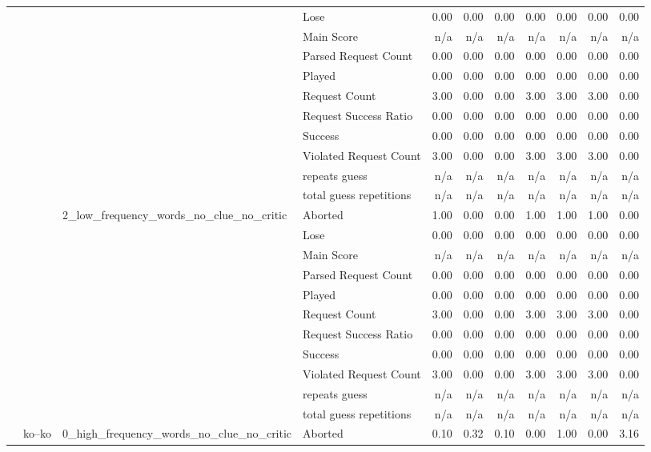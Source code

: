 \begin{tabular}{llllrrrrrrr}
 &  &  & Lose & 0.00 & 0.00 & 0.00 & 0.00 & 0.00 & 0.00 & 0.00 \\
 &  &  & Main Score & n/a & n/a & n/a & n/a & n/a & n/a & n/a \\
 &  &  & Parsed Request Count & 0.00 & 0.00 & 0.00 & 0.00 & 0.00 & 0.00 & 0.00 \\
 &  &  & Played & 0.00 & 0.00 & 0.00 & 0.00 & 0.00 & 0.00 & 0.00 \\
 &  &  & Request Count & 3.00 & 0.00 & 0.00 & 3.00 & 3.00 & 3.00 & 0.00 \\
 &  &  & Request Success Ratio & 0.00 & 0.00 & 0.00 & 0.00 & 0.00 & 0.00 & 0.00 \\
 &  &  & Success & 0.00 & 0.00 & 0.00 & 0.00 & 0.00 & 0.00 & 0.00 \\
 &  &  & Violated Request Count & 3.00 & 0.00 & 0.00 & 3.00 & 3.00 & 3.00 & 0.00 \\
 &  &  & repeats guess & n/a & n/a & n/a & n/a & n/a & n/a & n/a \\
 &  &  & total guess repetitions & n/a & n/a & n/a & n/a & n/a & n/a & n/a \\
\cline{3-11}
 &  & \multirow[t]{11}{*}{2_low_frequency_words_no_clue_no_critic} & Aborted & 1.00 & 0.00 & 0.00 & 1.00 & 1.00 & 1.00 & 0.00 \\
 &  &  & Lose & 0.00 & 0.00 & 0.00 & 0.00 & 0.00 & 0.00 & 0.00 \\
 &  &  & Main Score & n/a & n/a & n/a & n/a & n/a & n/a & n/a \\
 &  &  & Parsed Request Count & 0.00 & 0.00 & 0.00 & 0.00 & 0.00 & 0.00 & 0.00 \\
 &  &  & Played & 0.00 & 0.00 & 0.00 & 0.00 & 0.00 & 0.00 & 0.00 \\
 &  &  & Request Count & 3.00 & 0.00 & 0.00 & 3.00 & 3.00 & 3.00 & 0.00 \\
 &  &  & Request Success Ratio & 0.00 & 0.00 & 0.00 & 0.00 & 0.00 & 0.00 & 0.00 \\
 &  &  & Success & 0.00 & 0.00 & 0.00 & 0.00 & 0.00 & 0.00 & 0.00 \\
 &  &  & Violated Request Count & 3.00 & 0.00 & 0.00 & 3.00 & 3.00 & 3.00 & 0.00 \\
 &  &  & repeats guess & n/a & n/a & n/a & n/a & n/a & n/a & n/a \\
 &  &  & total guess repetitions & n/a & n/a & n/a & n/a & n/a & n/a & n/a \\
\cline{2-11} \cline{3-11}
 & \multirow[t]{33}{*}{ko--ko} & \multirow[t]{11}{*}{0_high_frequency_words_no_clue_no_critic} & Aborted & 0.10 & 0.32 & 0.10 & 0.00 & 1.00 & 0.00 & 3.16 \\

\end{tabular}

